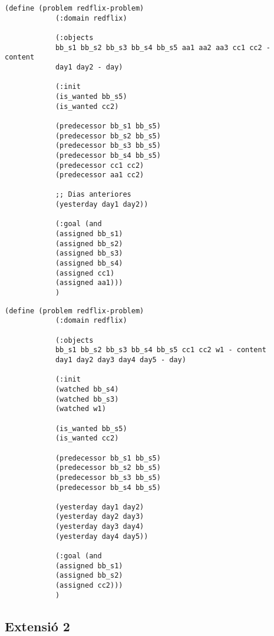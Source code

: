 \documentclass[a4paper]{article}
\begin{document}
	
	\noindent
	\begin{minipage}[t]{0.45\textwidth}
		\begin{lstlisting}[language=PDDL, caption={Joc de Prova 1 - Extensió 1}, label={lst:JP11}]                     
			(define (problem redflix-problem)
			(:domain redflix)
			
			(:objects
			bb_s1 bb_s2 bb_s3 bb_s4 bb_s5 aa1 aa2 aa3 cc1 cc2 - content
			day1 day2 - day)
			
			(:init
			(is_wanted bb_s5)
			(is_wanted cc2)
			
			(predecessor bb_s1 bb_s5)
			(predecessor bb_s2 bb_s5)
			(predecessor bb_s3 bb_s5)
			(predecessor bb_s4 bb_s5)
			(predecessor cc1 cc2)
			(predecessor aa1 cc2)
			
			;; Dias anteriores
			(yesterday day1 day2))
			
			(:goal (and
			(assigned bb_s1)
			(assigned bb_s2)
			(assigned bb_s3)
			(assigned bb_s4)
			(assigned cc1)
			(assigned aa1)))
			)
		\end{lstlisting}
		
	\end{minipage}
	\hfill
	\begin{minipage}[t]{0.45\textwidth}
		\begin{lstlisting}[language=PDDL, caption={Joc de Prova 2 - Extensió 1}, label={lst:JP21}]                     
			(define (problem redflix-problem)
			(:domain redflix)
			
			(:objects
			bb_s1 bb_s2 bb_s3 bb_s4 bb_s5 cc1 cc2 w1 - content
			day1 day2 day3 day4 day5 - day)
			
			(:init
			(watched bb_s4)
			(watched bb_s3)
			(watched w1)
			
			(is_wanted bb_s5)
			(is_wanted cc2)
			
			(predecessor bb_s1 bb_s5)
			(predecessor bb_s2 bb_s5)
			(predecessor bb_s3 bb_s5)
			(predecessor bb_s4 bb_s5)
			
			(yesterday day1 day2)
			(yesterday day2 day3)
			(yesterday day3 day4)
			(yesterday day4 day5))
			
			(:goal (and
			(assigned bb_s1)
			(assigned bb_s2)
			(assigned cc2)))
			)	
		\end{lstlisting}
	\end{minipage}
	
	
	
	\subsection{Extensió 2}
	
\end{document}
